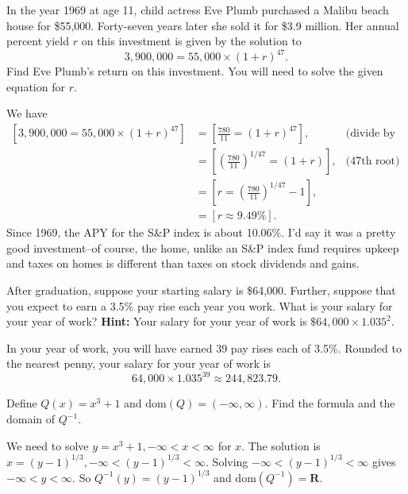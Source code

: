 \documentclass[12pt, answers,fleqn]{exam}
\newcommand{\reals}{\mathbf{R}}
\newcommand{\dom}{\mbox{dom}}
\begin{document}
\begin{questions}
\question  In the year 1969 at age 11, child actress Eve Plumb purchased a Malibu beach house for \$55,000. Forty-seven years
later she sold it for \$3.9 million. Her annual percent yield $r$ on this investment is given by the solution to
\[
       3, 900,000 = 55,000 \times (1 + r)^{47}.
\]
Find Eve Plumb's return on this investment. You will need to solve the given equation for $r$.
    \begin{solution}%
        We have
        \begin{align*}
            \left [3, 900,000 = 55,000 \times (1 + r)^{47} \right] &= 
           \left [\frac{780}{11} = (1 + r)^{47} \right] , &\mbox{(divide by 55000)}\\
            &= \left [\left(\frac{780}{11}\right)^{1/47} = (1 + r) \right] , &\mbox{(47th root)}\\
            &= \left [r = \left(\frac{780}{11} \right)^{1/47} - 1 \right], \\
            &= \left [r \approx 9.49\% \right ].
        \end{align*}
    Since 1969, the APY for the S\&P index is about 10.06\%. I'd
    say it was a pretty good investment--of course, the home, unlike
    an S\&P index fund requires upkeep and taxes on homes is different
    than taxes on stock dividends and gains.
    \end{solution}
    \question   After graduation, suppose your starting salary is \$64,000. Further, suppose
that you expect to earn a 3.5\% pay rise each year you work. What is your salary for 
your  year of work?  \textbf{Hint:} Your salary for your  year of work
is $\$64,000 \times 1.035^2$.
\begin{solution}%
In your  year of work, you will have earned 39 pay rises each of 3.5\%. Rounded to 
the nearest penny, your salary for your  year of work is
\begin{equation*}
   64,000 \times 1.035^{39} \approx 244,823.79.
 \end{equation*}   
\end{solution}

\question   Define $Q(x) = x^3 + 1$ and $\dom(Q) = (-\infty,\infty)$. Find the formula
and the domain of $Q^{-1}$. 
\begin{solution} 
    We need to solve $y = x^3+1, -\infty < x < \infty $ for $x$. The
    solution is $x = (y-1)^{1/3}, -\infty < (y-1)^{1/3} < \infty $. 
    Solving $-\infty < (y-1)^{1/3} < \infty$ gives $ -\infty < y < \infty$.
    So  $Q^{-1}(y) = (y-1)^{1/3}$ and $\dom(Q^{-1}) = \reals$.


\end{solution}
\end{questions}
\end{document}
